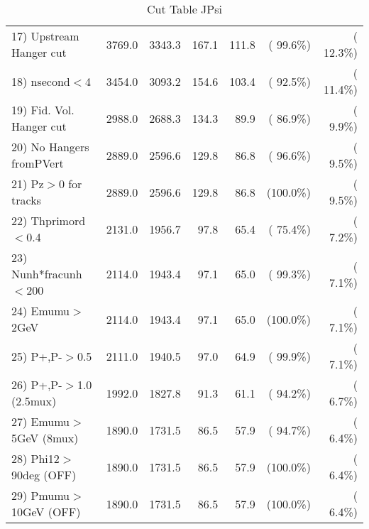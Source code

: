 \begin{table}[h!]
\begin{tabular}{||l||r|r|r|r|r|r||}
 17) Upstream Hanger cut  &       3769.0 &       3343.3 &        167.1 &        111.8 & ( 99.6\%) & ( 12.3\%) \\
 18) nsecond$<$4          &       3454.0 &       3093.2 &        154.6 &        103.4 & ( 92.5\%) & ( 11.4\%) \\
 19) Fid. Vol. Hanger cut &       2988.0 &       2688.3 &        134.3 &         89.9 & ( 86.9\%) & (  9.9\%) \\
 20) No Hangers fromPVert &       2889.0 &       2596.6 &        129.8 &         86.8 & ( 96.6\%) & (  9.5\%) \\
 21) Pz$>$0 for tracks    &       2889.0 &       2596.6 &        129.8 &         86.8 & (100.0\%) & (  9.5\%) \\
 22) Thprimord$<$0.4      &       2131.0 &       1956.7 &         97.8 &         65.4 & ( 75.4\%) & (  7.2\%) \\
 23) Nunh*fracunh$<$200   &       2114.0 &       1943.4 &         97.1 &         65.0 & ( 99.3\%) & (  7.1\%) \\
 24) Emumu$>$2GeV         &       2114.0 &       1943.4 &         97.1 &         65.0 & (100.0\%) & (  7.1\%) \\
 25) P+,P-$>$0.5          &       2111.0 &       1940.5 &         97.0 &         64.9 & ( 99.9\%) & (  7.1\%) \\
 26) P+,P-$>$1.0 (2.5mux) &       1992.0 &       1827.8 &         91.3 &         61.1 & ( 94.2\%) & (  6.7\%) \\
 27) Emumu$>$5GeV  (8mux) &       1890.0 &       1731.5 &         86.5 &         57.9 & ( 94.7\%) & (  6.4\%) \\
 28) Phi12$>$90deg  (OFF) &       1890.0 &       1731.5 &         86.5 &         57.9 & (100.0\%) & (  6.4\%) \\
 29) Pmumu$>$10GeV  (OFF) &       1890.0 &       1731.5 &         86.5 &         57.9 & (100.0\%) & (  6.4\%) \\
 \hline
 \hline
 \end{tabular}
 \caption{Cut Table  JPsi     }
 \label{tab-cutcohjpsi-mumu_cohrhop}
 \end{table}
